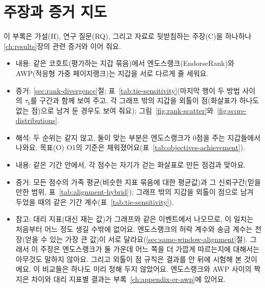 \section{주장과 증거 지도}
\label{ch:appendix-claims}

이 부록은 가설(H), 연구 질문(RQ), 그리고 자료로 뒷받침하는 주장(C)을 하나하나 \ref{ch:results}장의 관련 증거와 이어 줘요.


\begin{itemize}
\item 내용: 같은 코호트(평가하는 지갑 묶음)에서 엔도스랭크(EndorseRank)와 AWP(적응형 가중 페이지랭크)는 지갑을 서로 다르게 줄 세워요.
\item 증거: \ref{sec:rank-divergence}절; 표~\ref{tab:tie-sensitivity}(마지막 행이 두 방법 사이의 $\tau_b$를 구간과 함께 보여 주고, 각 그래프 밖의 지갑을 외톨이 점(화살표가 하나도 없는 점)으로 남겨 둔 경우도 보여 줘요); 그림~\ref{fig:rank-scatter}와~\ref{fig:score-distributions}.
\item 해석: 두 순위는 같지 않고, 둘이 맞는 부분은 엔도스랭크가 0점을 주는 지갑들에서 나와요. 목표(O) O1의 기준은 채워졌어요(표~\ref{tab:objectives-achievement}).
\end{itemize}


\begin{itemize}
\item 내용: 같은 기간 안에서, 각 점수는 자기가 걷는 화살표로 만든 점검과 맞아요.
\item 증거: 모든 점수의 가족 평균(비슷한 지표 묶음에 대한 평균값)과 그 신뢰구간(믿을 만한 범위, 표~\ref{tab:alignment-hybrid}); 그래프 밖의 지갑을 외톨이 점으로 남겨 두었을 때의 같은 기간 계수(표~\ref{tab:tie-sensitivity}).
\item 참고: 대리 지표(대신 재는 값)가 그래프와 같은 이벤트에서 나오므로, 이 일치는 처음부터 어느 정도 생길 수밖에 없어요. 엔도스랭크의 허락 계수와 송금 계수는 천장(얻을 수 있는 가장 큰 값)이 서로 달라요(\ref{sec:same-window-alignment}절). 그래서 이 주장은 엔도스랭크가 둘 가운데 어느 쪽을 더 가깝게 따르는지에 대해서는 아무것도 말하지 않아요. 그리고 외톨이 점 규칙은 결과를 안 뒤에 시험해 본 것이에요. 이 비교들은 하나도 미리 정해 두지 않았어요. 엔도스랭크와 AWP 사이의 짝지은 차이와 대리 지표별 결과는 부록~\ref{ch:appendix-er-awp}에 있어요.
\end{itemize}

